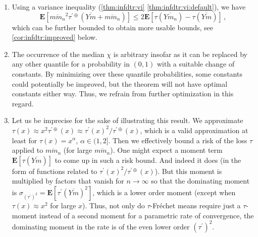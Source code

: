 \documentclass{article}
\newcommand{\lab}{\left[} %
\newcommand{\rab}{\right]} %
\newcommand{\ab}[1]{\lab #1 \rab} %
\newcommand{\abOf}[1]{\!\ab{#1}} %
\newcommand{\E}{\mathbf{E}} %
\newcommand{\Eof}[1]{\E[#1]}
\newcommand{\EOf}[1]{\E\abOf{#1}}
\newcommand{\pr}{^\prime}
\newcommand{\eqcm}{\,,} %
\newcommand{\ol}[2]{\overline{#1#2}}
\newcommand{\tran}{\tau}
\newcommand{\dtran}{\tau\pr}
\newcommand{\ddrtran}{\tau^{\prime\oplus}}
\begin{document}
\begin{remark}
    \begin{enumerate}[label=(\roman*)]
        \item
        Using a variance inequality (\cref{thm:infdtr:vi} \ref{thm:infdtr:vi:default}), we have 
        \begin{equation}
            \EOf{\ol m{m_n}^2 \ddrtran(\ol Ym + \ol m{m_n})} \leq 2 \EOf{\tran(\ol Y{m_n}) - \tran(\ol Ym)}
            \eqcm
        \end{equation}
        which can be further bounded to obtain more usable bounds, see \cref{cor:infdtr:improved} below.
        \item 
        The occurrence of the median $\chi$ is arbitrary insofar as it can be replaced by any other quantile for a probability in $(0,1)$ with a suitable change of constants. By minimizing over these quantile probabilities, some constants could potentially be improved, but the theorem will not have optimal constants either way. Thus, we refrain from further optimization in this regard.
        \item
        Let us be imprecise for the sake of illustrating this result. We approximate $\tran(x) \approx x^2 \ddrtran(x) \approx \dtran(x)^2/\ddrtran(x)$, which is a valid approximation at least for $\tran(x) = x^\alpha$, $\alpha\in(1, 2]$. Then we effectively bound a risk of the loss $\tran$ applied to $\ol m{m_n}$ (for large $\ol m{m_n}$). One might expect a moment term $\Eof{\tran(\ol Ym)}$ to come up in such a risk bound. And indeed it does (in the form of functions related to $\dtran(x)^2/\ddrtran(x)$). But this moment is multiplied by factors that vanish for $n\to\infty$ so that the dominating moment is $\sigma_{(\dtran)^2} = \Eof{\dtran(\ol Ym)^2}$, which is a lower order moment (except when $\tran(x) \approx x^2$ for large $x$). Thus, not only do $\tran$-Fr\'echet means require just a $\tran$-moment instead of a second moment for a parametric rate of convergence, the dominating moment in the rate is of the even lower order $(\dtran)^2$.
    \end{enumerate}
\end{remark}
%
\end{document}

